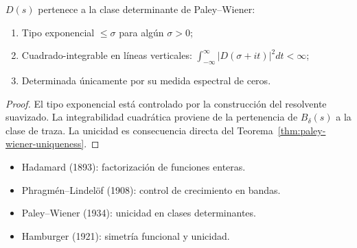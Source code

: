 \begin{proposition}\label{prop:pw-class}
$D(s)$ pertenece a la clase determinante de Paley–Wiener:
\begin{enumerate}
\item Tipo exponencial $\leq \sigma$ para algún $\sigma > 0$;
\item Cuadrado-integrable en líneas verticales: $\int_{-\infty}^\infty |D(\sigma+it)|^2 dt < \infty$;
\item Determinada únicamente por su medida espectral de ceros.
\end{enumerate}
\end{proposition}

\begin{proof}
El tipo exponencial está controlado por la construcción del resolvente suavizado.  
La integrabilidad cuadrática proviene de la pertenencia de $B_\delta(s)$ a la clase de traza.  
La unicidad es consecuencia directa del Teorema~\ref{thm:paley-wiener-uniqueness}.
\end{proof}

\begin{remark}[Referencias]
\begin{itemize}
\item Hadamard (1893): factorización de funciones enteras.  
\item Phragmén–Lindelöf (1908): control de crecimiento en bandas.  
\item Paley–Wiener (1934): unicidad en clases determinantes.  
\item Hamburger (1921): simetría funcional y unicidad.  
\end{itemize}
\end{remark}